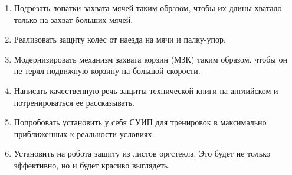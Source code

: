 \begin{enumerate}
\begin{enumerate}
  	\item Подрезать лопатки захвата мячей таким образом, чтобы их длины хватало только на захват больших мячей.
  	
  	\item Реализовать защиту колес от наезда на мячи и палку-упор.
  	
  	\item Модернизировать механизм захвата корзин (МЗК) таким образом, чтобы он не терял подвижную корзину на большой скорости.
  	
  	\item Написать качественную речь защиты технической книги на английском и потренироваться ее рассказывать.
  	  	
  	\item Попробовать установить у себя СУИП для тренировок в максимально приближенных к реальности условиях.
  	
  	\item Установить на робота защиту из листов оргстекла. Это будет не только эффективно, но и будет красиво выглядеть.
  	
  \end{enumerate}
  
\end{enumerate}
\fillpage